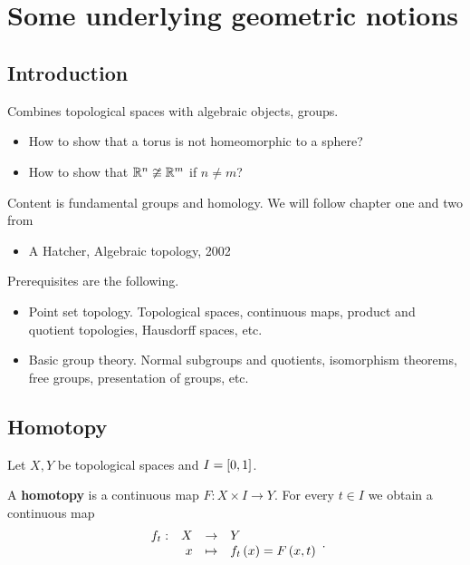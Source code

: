 \def\module{M3P21 Geometry II: Algebraic Topology}
\def\lecturer{Dr Christian Urech}
\def\term{Spring 2019}

\def\thm{section}







\section{Some underlying geometric notions}

\subsection{Introduction}


Combines topological spaces with algebraic objects, groups.
\begin{itemize}
\item How to show that a torus is not homeomorphic to a sphere?
\item How to show that $ \R^n \ncong \R^m $ if $ n \ne m $?
\end{itemize}

Content is fundamental groups and homology. We will follow chapter one and two from
\begin{itemize}
\item A Hatcher, Algebraic topology, 2002
\end{itemize}

Prerequisites are the following.
\begin{itemize}
\item Point set topology. Topological spaces, continuous maps, product and quotient topologies, Hausdorff spaces, etc.
\item Basic group theory. Normal subgroups and quotients, isomorphism theorems, free groups, presentation of groups, etc.
\end{itemize}

\subsection{Homotopy}

Let $ X, Y $ be topological spaces and $ I = \sb{0, 1} $.

\begin{definition}
A \textbf{homotopy} is a continuous map $ F : X \times I \to Y $. For every $ t \in I $ we obtain a continuous map
$$ \function[f_t]{X}{Y}{x}{f_t\rb{x} = F\rb{x, t}}. $$
\end{definition}

